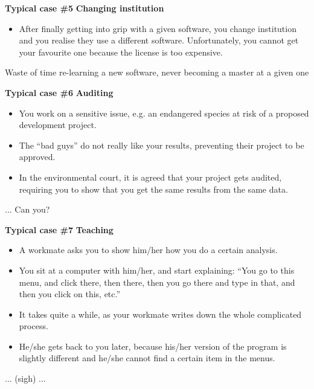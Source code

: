 \documentclass[9pt,xcolor=pdftex,dvipsnames,table]{beamer}
\begin{document}
\begin{frame}{\textbf{Typical case \#5}}
\textbf{Changing institution}
\begin{itemize}
\item After finally getting into grip with a given software, you
  change institution and you realise they use a different
  software. Unfortunately, you cannot get your favourite one because
  the license is too expensive.
\end{itemize}
\vspace{0.6cm}
Waste of time re-learning a new software, never becoming a master at a
given one
\vspace{-0.5cm}
\end{frame}


\begin{frame}{\textbf{Typical case \#6}}
\textbf{Auditing}
\begin{itemize}
\item You work on a sensitive issue, e.g. an endangered species at
  risk of a proposed development project.
\item The ``bad guys'' do not really like your results, preventing
  their project to be approved.
\item In the environmental court, it is agreed that your project gets
  audited, requiring you to show that you get the same results from
  the same data.
\end{itemize}
\vspace{0.6cm}
... Can you?
\vspace{-0.5cm}
\end{frame}



\begin{frame}{\textbf{Typical case \#7}}
\textbf{Teaching}
\begin{itemize}
\item A workmate asks you to show him/her how you do a certain analysis.
\item You sit at a computer with him/her, and start explaining: 
``You go to this menu, and click there, then there, then you go there
and type in that, and then you click on this, etc.''
\item It takes quite a while, as your workmate writes down the whole
  complicated process.
\item He/she gets back to you later, because his/her version of the
  program is slightly different and he/she cannot find a certain item
  in the menus.
\end{itemize}
\vspace{0.6cm}
... (sigh) ...
\vspace{-0.5cm}
\end{frame}
\end{document}
